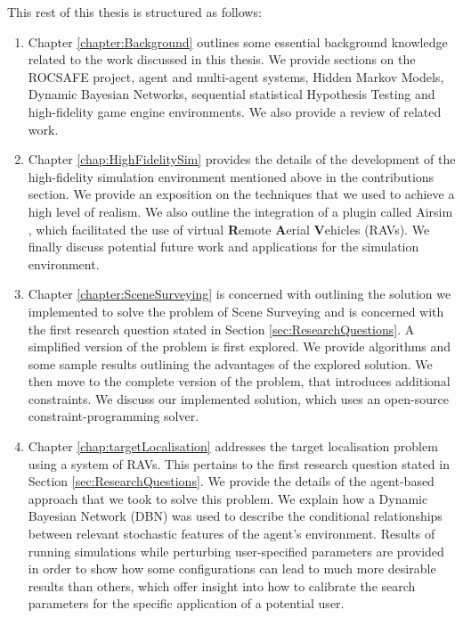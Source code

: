 This rest of this thesis is structured as follows: 
\begin{enumerate}
    \item Chapter \ref{chapter:Background} outlines some essential background knowledge related to the work discussed in this thesis. We provide sections on the ROCSAFE project, agent and multi-agent systems, Hidden Markov Models, Dynamic Bayesian Networks, sequential statistical Hypothesis Testing and high-fidelity game engine environments. We also provide a review of related work.
    
    \item Chapter \ref{chap:HighFidelitySim} provides the details of the development of the high-fidelity simulation environment mentioned above in the contributions section. We provide an exposition on the techniques that we used to achieve a high level of realism. We also outline the integration of a plugin called Airsim \cite{Shah2017AirSim:Vehicles}, which facilitated the use of virtual \textbf{R}emote \textbf{A}erial \textbf{V}ehicles (RAVs). We finally discuss potential future work and applications for the simulation environment.
    
    \item Chapter \ref{chapter:SceneSurveying} is concerned with outlining the solution we implemented to solve the problem of Scene Surveying and is concerned with the first research question stated in Section \ref{sec:ResearchQuestions}. A simplified version of the problem is first explored. We provide algorithms and some sample results outlining the advantages of the explored solution. We then move to the complete version of the problem, that introduces additional constraints. We discuss our implemented solution, which uses an open-source constraint-programming solver.
    
    \item Chapter \ref{chap:targetLocalisation} addresses the target localisation problem using a system of RAVs. This pertains to the first  research question stated in Section \ref{sec:ResearchQuestions}. We provide the details of the agent-based approach that we took to solve this problem. We explain how a Dynamic Bayesian Network (DBN) was used to describe the conditional relationships between relevant stochastic features of the agent's environment. Results of running simulations while perturbing user-specified parameters are provided in order to show how some configurations can lead to much more desirable results than others, which offer insight into how to calibrate the search parameters for the specific application of a potential user.
    
\end{enumerate}